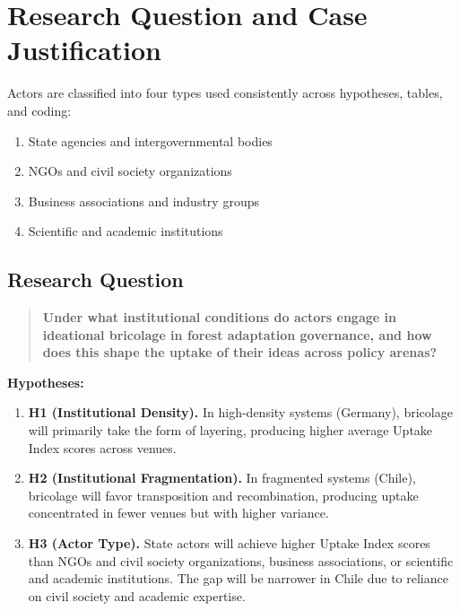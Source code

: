 
\section*{Research Question and Case Justification}

Actors are classified into four types used consistently across hypotheses, 
tables, and coding: 
\begin{enumerate}
  \item State agencies and intergovernmental bodies
  \item NGOs and civil society organizations
  \item Business associations and industry groups
  \item Scientific and academic institutions
\end{enumerate}

\subsection*{Research Question}

\begin{quote}
\textbf{Under what institutional conditions do actors engage in ideational
bricolage in forest adaptation governance, and how does this shape the uptake
of their ideas across policy arenas?}
\end{quote}

\textbf{Hypotheses:}  
\begin{enumerate}
    \item \textbf{H1 (Institutional Density).} In high-density systems
    (Germany), bricolage will primarily take the form of layering, producing
    higher average Uptake Index scores across venues.
    \item \textbf{H2 (Institutional Fragmentation).} In fragmented systems
    (Chile), bricolage will favor transposition and recombination, producing
    uptake concentrated in fewer venues but with higher variance.
    \item \textbf{H3 (Actor Type).} State actors will achieve higher Uptake
    Index scores than NGOs and civil society organizations, business
    associations, or scientific and academic institutions. The gap will be
    narrower in Chile due to reliance on civil society and academic expertise.
\end{enumerate}

